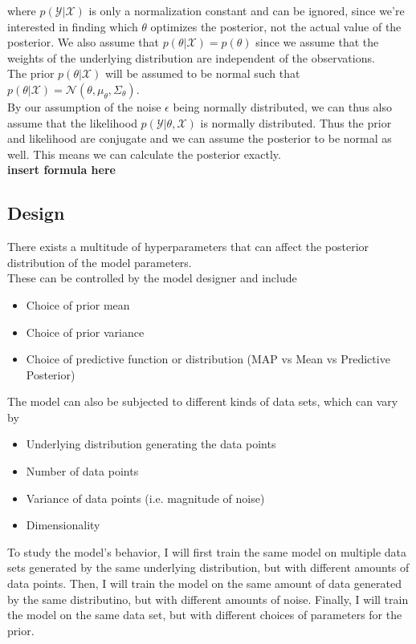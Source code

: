 where $p(\mathcal{Y}|\mathcal{X})$ is only a normalization constant and can be ignored, since we're interested in finding which $\theta$ optimizes the posterior, not the actual value of the posterior. We also assume that $p(\theta|\mathcal{X})=p(\theta)$ since we assume that the weights of the underlying distribution are independent of the observations.\\
The prior $p(\theta|\mathcal{X})$ will be assumed to be normal such that $p(\theta | \mathcal{X}) = \mathcal{N}(\theta, \mu_\theta, \Sigma_\theta)$.\\
By our assumption of the noise $\epsilon$ being normally distributed, we can thus also assume that the likelihood $p(\mathcal{Y}|\theta, \mathcal{X})$ is normally distributed. 
Thus the prior and likelihood are conjugate and we can assume the posterior to be normal as well. This means we can calculate the posterior exactly. \\
\textbf{insert formula here}\\
\subsection{Design}
There exists a multitude of hyperparameters that can affect the posterior distribution of the model parameters.\\
These can be controlled by the model designer and include
\begin{itemize}
  \item Choice of prior mean 
    \item Choice of prior variance
    \item Choice of predictive function or distribution (MAP vs Mean vs Predictive Posterior)
\end{itemize}
The model can also be subjected to different kinds of data sets, which can vary by
\begin{itemize}
  \item Underlying distribution generating the data points
  \item Number of data points
  \item Variance of data points (i.e. magnitude of noise)
  \item Dimensionality
\end{itemize}
To study the model's behavior, I will first train the same model on multiple data sets generated by the same underlying distribution, but with different amounts of data points.
Then, I will train the model on the same amount of data generated by the same distributino, but with different amounts of noise.
Finally, I will train the model on the same data set, but with different choices of parameters for the prior.
